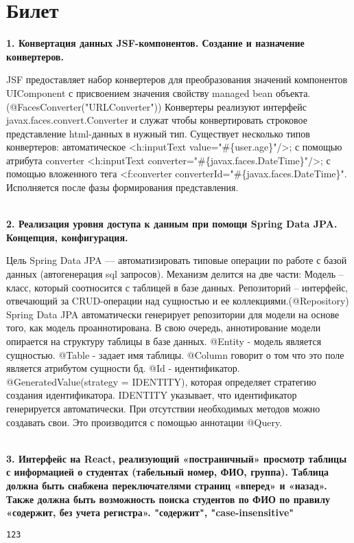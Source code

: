 \documentclass{article}
\newcommand{\bil}[5]{%
        \section{Билет}
        \textbf{1. #1}

        #4
        \\
        \textbf{2. #2}
        
        #5
        \\
        \textbf{3. #3}
}
\begin{document}
\bil{Конвертация данных JSF-компонентов. Создание и назначение конвертеров.}
{Реализация уровня доступа к данным при помощи Spring Data JPA. Концепция, конфигурация.}
{Интерфейс на React, реализующий «постраничный» просмотр таблицы с информацией о студентах (табельный номер, ФИО, группа). Таблица должна быть снабжена переключателями страниц «вперед» и «назад». Также должна быть возможность поиска студентов по ФИО по правилу «содержит, без учета регистра». "содержит", "case-insensitive" }{
    JSF предоставляет набор конвертеров для преобразования значений компонентов UIComponent с присвоением значения свойству managed bean объекта. (@FacesConverter("URLConverter"))
    Конвертеры реализуют интерфейс javax.faces.convert.Converter и служат чтобы конвертировать строковое представление html-данных в нужный тип. Существует несколько типов конвертеров: автоматическое <h:inputText value="\#\{user.age\}"/>; с помощью атрибута converter <h:inputText converter="\#\{javax.faces.DateTime\}"/>;
    с помощью вложенного тега <f:converter converterId="\#\{javax.faces.DateTime\}".
    Исполняется после фазы формирования представления.
}{
    Цель Spring Data JPA — автоматизировать типовые операции по работе с базой данных (автогенерация sql запросов). 
    Механизм делится на две части:
    Модель – класс, который соотносится с таблицей в базе данных.
    Репозиторий – интерфейс, отвечающий за CRUD-операции над сущностью и ее коллекциями.(@Repository)
    Spring Data JPA автоматически генерирует репозитории для модели на основе того, как модель проаннотирована. 
    В свою очередь, аннотирование модели опирается на структуру таблицы в базе данных.
    @Entity - модель является сущностью.
    @Table - задает имя таблицы.
    @Column говорит о том что это поле является атрибутом сущности бд.
    @Id - идентификатор.
    @GeneratedValue(strategy = IDENTITY), которая определяет стратегию создания идентификатора. IDENTITY указывает, что идентификатор генерируется автоматически.
    При отсутствии необходимых методов можно создавать свои. Это производится с помощью аннотации @Query.
}
\begin{lstlisting}[frame=single, basicstyle=\ttfamily, breaklines=true, breakatwhitespace=true, postbreak=\mbox{\textcolor{red}{$\hookrightarrow$}\space}]
123
\end{lstlisting}
\end{document}

